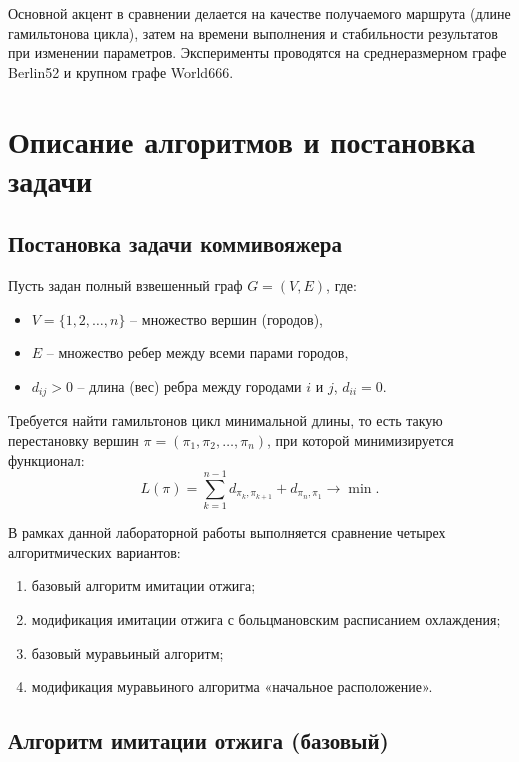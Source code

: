 \documentclass[12pt,a4paper]{article}
\begin{document}
Основной акцент в сравнении делается на качестве получаемого маршрута (длине гамильтонова цикла), затем на времени выполнения и стабильности результатов при изменении параметров. Эксперименты проводятся на среднеразмерном графе Berlin52 и крупном графе World666.

\section{Описание алгоритмов и постановка задачи}
\label{sec:algorithms}

\subsection{Постановка задачи коммивояжера}

Пусть задан полный взвешенный граф $G=(V,E)$, где:
\begin{itemize}
    \item $V=\{1,2,\dots,n\}$ -- множество вершин (городов),
    \item $E$ -- множество ребер между всеми парами городов,
    \item $d_{ij}>0$ -- длина (вес) ребра между городами $i$ и $j$, $d_{ii}=0$.
\end{itemize}

Требуется найти гамильтонов цикл минимальной длины, то есть такую перестановку вершин
$\pi=(\pi_1,\pi_2,\dots,\pi_n)$, при которой минимизируется функционал:
\begin{equation}
L(\pi)=\sum_{k=1}^{n-1} d_{\pi_k,\pi_{k+1}} + d_{\pi_n,\pi_1} \rightarrow \min.
\end{equation}

В рамках данной лабораторной работы выполняется сравнение четырех алгоритмических вариантов:
\begin{enumerate}
    \item базовый алгоритм имитации отжига;
    \item модификация имитации отжига с больцмановским расписанием охлаждения;
    \item базовый муравьиный алгоритм;
    \item модификация муравьиного алгоритма «начальное расположение».
\end{enumerate}

\subsection{Алгоритм имитации отжига (базовый)}
\end{document}
